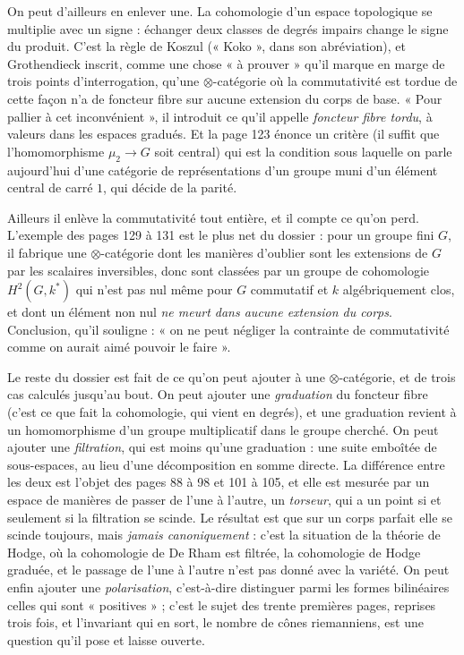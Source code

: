 \documentclass[11pt,a4paper]{article}
\begin{document}
\begin{resume}
On peut d'ailleurs en enlever une.
La cohomologie d'un espace topologique se multiplie avec un signe : échanger
deux classes de degrés impairs change le signe du produit. C'est la règle de
Koszul (« Koko », dans son abréviation), et Grothendieck inscrit, comme
une chose « à prouver » qu'il marque en marge de trois points
d'interrogation, qu'une $\otimes$-catégorie où la commutativité est tordue de
cette façon n'a de foncteur fibre sur aucune extension du corps de base. « Pour
pallier à cet inconvénient », il introduit ce qu'il appelle \emph{foncteur
fibre tordu}, à valeurs dans les espaces gradués. Et
la page 123 énonce un critère (il suffit que l'homomorphisme $\mu_{2} \to
G$ soit central) qui est la condition sous laquelle on parle aujourd'hui
d'une catégorie de représentations d'un groupe muni d'un élément central de
carré $1$, qui décide de la parité.

Ailleurs il enlève la commutativité tout entière, et il compte ce qu'on perd.
L'exemple des pages 129 à 131 est le plus net du dossier : pour un groupe fini
$G$, il fabrique une $\otimes$-catégorie dont les manières d'oublier sont
les extensions de $G$ par les scalaires inversibles, donc sont
classées par un groupe de cohomologie $H^{2}(G, k^{*})$ qui n'est pas nul même
pour $G$ commutatif et $k$ algébriquement clos, et dont un élément non nul
\emph{ne meurt dans aucune extension du corps}. Conclusion, qu'il souligne :
« on ne peut négliger la contrainte de commutativité comme on aurait aimé
pouvoir le faire ».

Le reste du dossier est fait de ce qu'on peut ajouter à une
$\otimes$-catégorie, et de trois cas calculés jusqu'au bout. On peut ajouter
une \emph{graduation} du foncteur fibre (c'est ce que fait la cohomologie,
qui vient en degrés), et une graduation revient à un homomorphisme d'un
groupe multiplicatif dans le groupe cherché. On peut ajouter une
\emph{filtration}, qui est moins qu'une graduation : une suite emboîtée de
sous-espaces, au lieu d'une décomposition en somme directe. La différence entre
les deux est l'objet des pages 88 à 98 et 101 à 105, et elle est mesurée par un
espace de manières de passer de l'une à l'autre, un \emph{torseur}, qui a un point
si et seulement si la filtration se scinde. Le
résultat est que sur un corps parfait elle se scinde toujours, mais
\emph{jamais canoniquement} : c'est la situation de la théorie de
Hodge, où la cohomologie de De Rham est filtrée, la cohomologie de Hodge
graduée, et le passage de l'une à l'autre n'est pas donné avec la variété. On
peut enfin ajouter une \emph{polarisation}, c'est-à-dire distinguer parmi les
formes bilinéaires celles qui sont « positives » ; c'est le sujet des trente
premières pages, reprises trois fois, et l'invariant qui en sort, le nombre
de cônes riemanniens, est une question qu'il pose et laisse ouverte.


\end{resume}
\end{document}
